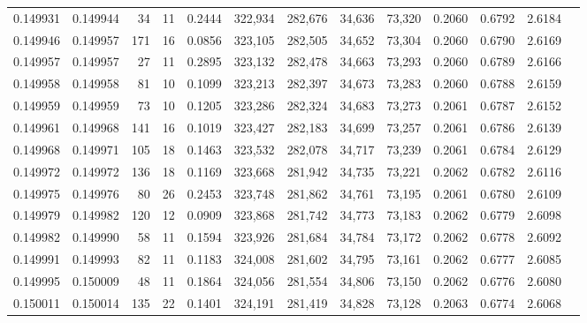 \begin{tabular}{rrrrrrrrrrrrr}
0.149931 & 0.149944 &    34 &  11 &                                     0.2444 & 322,934 & 282,676 &  34,636 &  73,320 & 0.2060 & 0.6792 & 2.6184 \\
0.149946 & 0.149957 &   171 &  16 &                                     0.0856 & 323,105 & 282,505 &  34,652 &  73,304 & 0.2060 & 0.6790 & 2.6169 \\
0.149957 & 0.149957 &    27 &  11 &                                     0.2895 & 323,132 & 282,478 &  34,663 &  73,293 & 0.2060 & 0.6789 & 2.6166 \\
0.149958 & 0.149958 &    81 &  10 &                                     0.1099 & 323,213 & 282,397 &  34,673 &  73,283 & 0.2060 & 0.6788 & 2.6159 \\
0.149959 & 0.149959 &    73 &  10 &                                     0.1205 & 323,286 & 282,324 &  34,683 &  73,273 & 0.2061 & 0.6787 & 2.6152 \\
0.149961 & 0.149968 &   141 &  16 &                                     0.1019 & 323,427 & 282,183 &  34,699 &  73,257 & 0.2061 & 0.6786 & 2.6139 \\
0.149968 & 0.149971 &   105 &  18 &                                     0.1463 & 323,532 & 282,078 &  34,717 &  73,239 & 0.2061 & 0.6784 & 2.6129 \\
0.149972 & 0.149972 &   136 &  18 &                                     0.1169 & 323,668 & 281,942 &  34,735 &  73,221 & 0.2062 & 0.6782 & 2.6116 \\
0.149975 & 0.149976 &    80 &  26 &                                     0.2453 & 323,748 & 281,862 &  34,761 &  73,195 & 0.2061 & 0.6780 & 2.6109 \\
0.149979 & 0.149982 &   120 &  12 &                                     0.0909 & 323,868 & 281,742 &  34,773 &  73,183 & 0.2062 & 0.6779 & 2.6098 \\
0.149982 & 0.149990 &    58 &  11 &                                     0.1594 & 323,926 & 281,684 &  34,784 &  73,172 & 0.2062 & 0.6778 & 2.6092 \\
0.149991 & 0.149993 &    82 &  11 &                                     0.1183 & 324,008 & 281,602 &  34,795 &  73,161 & 0.2062 & 0.6777 & 2.6085 \\
0.149995 & 0.150009 &    48 &  11 &                                     0.1864 & 324,056 & 281,554 &  34,806 &  73,150 & 0.2062 & 0.6776 & 2.6080 \\
0.150011 & 0.150014 &   135 &  22 &                                     0.1401 & 324,191 & 281,419 &  34,828 &  73,128 & 0.2063 & 0.6774 & 2.6068 \\

\end{tabular}
